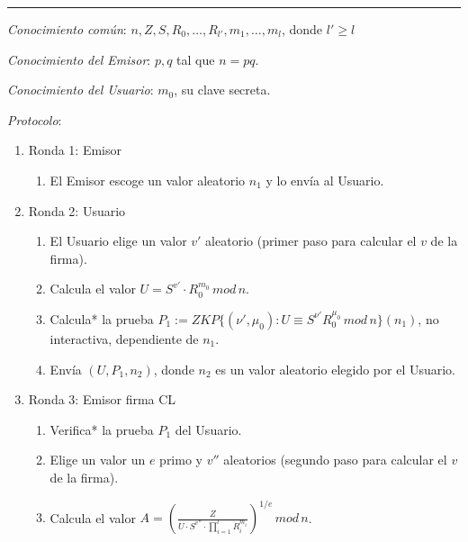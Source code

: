 \rule{\textwidth}{1pt}
\begin{algorithm}
	\hfil
	
	\textit{Conocimiento común}: $n,Z,S,R_0,\dots,R_{l'},m_1,\dots,m_l$, donde $l'\geq l$
	
	\textit{Conocimiento del Emisor}: $p,q$ tal que $n=pq$.
	
	\textit{Conocimiento del Usuario}: $m_0$, su clave secreta.
	
	\hfil
	
	\textit{Protocolo}:
	\begin{enumerate}
		\item Ronda 1: Emisor
		\begin{enumerate}[label*=\arabic*.]
			\item El Emisor escoge un valor aleatorio $n_1$ y lo envía al Usuario.
		\end{enumerate}
		
		\item Ronda 2: Usuario
		\begin{enumerate}[label*=\arabic*.]
		
			\item El Usuario elige un valor $v'$ aleatorio (primer paso para calcular el $v$ de la firma).
			
			\item Calcula el valor $U = S^{v'} \cdot R_0^{m_0} \, mod \, n$.
			
			\item Calcula* la prueba $P_1 := ZKP\{(\nu',\mu_0) : U \equiv S^{\nu'}R_0^{\mu_0} \, mod \, n \}(n_1)$, no interactiva, dependiente de $n_1$.
			
			\item Envía $(U,P_1,n_2)$, donde $n_2$ es un valor aleatorio elegido por el Usuario.

		\end{enumerate}

		\item Ronda 3: Emisor firma CL
		\begin{enumerate}[label*=\arabic*.]
			\item Verifica* la prueba $P_1$ del Usuario.
			
			\item Elige un valor un $e$ primo y $v''$ aleatorios (segundo paso para calcular el $v$ de la firma).
			
			\item Calcula el valor $A = \left(  \frac{Z}{U\cdot S^{v''}\cdot \prod_{i=1}^{l} R_i^{m_i}} \right)^{1/e} \, mod \, n$.
			

\end{enumerate}
\end{enumerate}
\end{algorithm}
